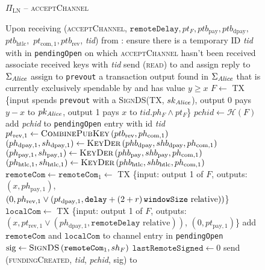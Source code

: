   \begin{figure}[H]
    \begin{protocolbox}{$\Pi_{\mathrm{LN}}$ -- \textsc{acceptChannel}}
      \begin{algorithmic}[1]
        \State Upon receiving (\textsc{acceptChannel}, $\mathtt{remoteDelay},
        pt_F, ptb_{\mathrm{pay}}, ptb_{\mathrm{dpay}},$ $ptb_{\mathrm{htlc}},$
        $pt_{\mathrm{com}, 1}, ptb_{\mathrm{rev}}$, \textit{tid}) from \bob:
        \Indent
          \State ensure there is a temporary ID \textit{tid} with \bob{} in
          \texttt{pendingOpen} on which \textsc{acceptChannel} hasn't been
          received
          \State associate received keys with \textit{tid}
          \State send (\textsc{read}) to \ledger{} and assign reply to
          $\Sigma_{\mathit{Alice}}$
          \State assign to \texttt{prevout} a transaction output found in
          $\Sigma_{\mathit{Alice}}$ that is currently exclusively spendable by \alice{}
          and has value $y \geq x$
          \State $F \gets$ TX \{input spends \texttt{prevout} with a
          \textsc{SignDS}(TX, $sk_{\mathit{Alice}}$), output 0 pays $y - x$ to
          $pk_{\mathit{Alice}}$, output 1 pays $x$ to $\mathit{tid}.ph_F \wedge pt_F$\}
          \State $\mathit{pchid} \gets \mathcal{H}\left(F\right)$
          \State add \textit{pchid} to \texttt{pendingOpen} entry with id
          \textit{tid}
          \State $pt_{\mathrm{rev}, 1} \gets
          \textsc{CombinePubKey}\left(ptb_{\mathrm{rev}}, ph_{\mathrm{com},
          1}\right)$
          \State $(ph_{\mathrm{dpay}, 1}, sh_{\mathrm{dpay}, 1}) \gets
          \textsc{KeyDer}\left(phb_{\mathrm{dpay}}, shb_{\mathrm{dpay}},
          ph_{\mathrm{com}, 1}\right)$
          \State $(ph_{\mathrm{pay}, 1}, sh_{\mathrm{pay}, 1}) \gets
          \textsc{KeyDer}\left(phb_{\mathrm{pay}}, shb_{\mathrm{pay}},
          ph_{\mathrm{com}, 1}\right)$
          \State $(ph_{\mathrm{htlc}, 1}, sh_{\mathrm{htlc}, 1}) \gets
          \textsc{KeyDer}\left(phb_{\mathrm{htlc}}, shb_{\mathrm{htlc}},
          ph_{\mathrm{com}, 1}\right)$
          \State $\mathtt{remoteCom} \gets \mathtt{remoteCom}_1 \gets$ TX
          \{input: output 1 of $F$, outputs: $(x, ph_{\mathrm{pay}, 1})$, $(0,
          ph_{\mathrm{rev}, 1} \vee (pt_{\mathrm{dpay}, 1}, \mathtt{delay} +
          \left(2 + r\right)\texttt{windowSize}{} \text{ relative}))$\}
          \State $\mathtt{localCom} \gets$ TX \{input: output 1 of $F$, outputs:
          $(x, pt_{\mathrm{rev}, 1} \vee (ph_{\mathrm{dpay}, 1},
          \mathtt{remoteDelay} \text{ relative}))$, $(0, pt_{\mathrm{pay},
          1})$\}
          \State add $\mathtt{remoteCom}$ and $\mathtt{localCom}$ to channel
          entry in \texttt{pendingOpen}
          \State $\mathrm{sig} \gets \textsc{SignDS}\left(\mathtt{remoteCom}_1,
          sh_F\right)$
          \State $\mathtt{lastRemoteSigned} \gets 0$
          \State send (\textsc{fundingCreated}, \textit{tid},
          \textit{pchid}, sig) to \bob{}
        \EndIndent
      \end{algorithmic}
    \end{protocolbox}
    \caption{}
    \label{alg:protocol:open:acceptChannel}
  \end{figure}

